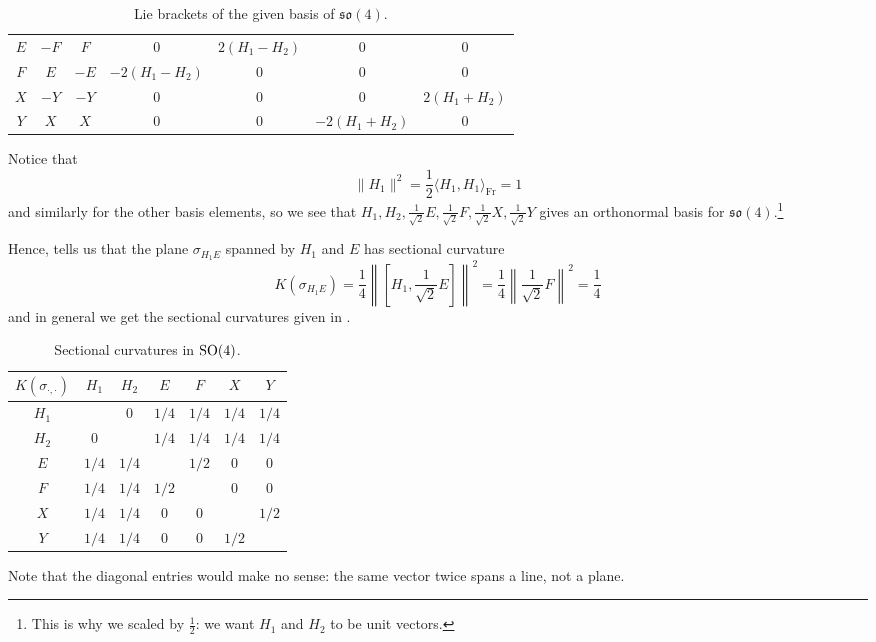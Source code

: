 \begin{example}
\begin{table}
\begin{center}
\begin{tabular}{c|cccccc}
			$E$ & $-F$ & $F$ & $0$ & $2(H_1-H_2)$ & $0$ & $0$ \\
			$F$ & $E$ & $-E$ & $-2(H_1-H_2)$ & $0$ & $ 0$ & $0$ \\
			$X$ & $-Y$ & $-Y$ & $0$ & $0$ & $0$ & $2(H_1+H_2)$ \\
			$Y$ & $X$ & $X$ & $0$ & $0$ & $-2(H_1+H_2)$ & $0$ 
		\end{tabular}
		\end{center}
		\caption{Lie brackets of the given basis of $\mathfrak{so}(4)$.}
		\label{tab:so4 mult table}
	\end{table}
	Notice that
	\[
		\|H_1\|^2 = \frac{1}{2} \langle H_1, H_1 \rangle_{\text{Fr}} = 1
	\]
	and similarly for the other basis elements, so we see that $H_1, H_2, \frac{1}{\sqrt{2}}E, \frac{1}{\sqrt{2}}F, \frac{1}{\sqrt{2}}X, \frac{1}{\sqrt{2}}Y$ gives an orthonormal basis for $\mathfrak{so}(4)$.\footnote{This is why we scaled by $\frac{1}{2}$: we want $H_1$ and $H_2$ to be unit vectors.} 
	
	Hence,  tells us that the plane $\sigma_{H_1E}$ spanned by $H_1$ and $E$ has sectional curvature
	\[
		K(\sigma_{H_1E}) = \frac{1}{4}\left\|\left[H_1,\frac{1}{\sqrt{2}}E\right]\right\|^2 = \frac{1}{4}\left\|\frac{1}{\sqrt{2}}F\right\|^2 = \frac{1}{4}
	\]
	and in general we get the sectional curvatures given in .
	\begin{table}
		\begin{center}
		\begin{tabular}{c|cccccc}
			$K(\sigma_{\cdot, \cdot})$ & $H_1$ & $H_2$ & $E$ & $F$ & $X$ & $Y$ \\
			\hline
			$H_1$ &  & $0$ & $1/4$ & $1/4$ & $1/4$ & $1/4$ \\
			$H_2$ & $0$ &  & $1/4$ & $1/4$ & $1/4$ & $1/4$ \\
			$E$ & $1/4$ & $1/4$ &  & $1/2$ & $0$ & $0$ \\
			$F$ & $1/4$ & $1/4$ & $1/2$ &  & $ 0$ & $0$ \\
			$X$ & $1/4$ & $1/4$ & $0$ & $0$ &  & $1/2$ \\
			$Y$ & $1/4$ & $1/4$ & $0$ & $0$ & $1/2$ & 
		\end{tabular}
		\end{center}
		\caption{Sectional curvatures in  $\operatorname{SO}(4)$.}
		\label{tab:so4 sectional curvatures}
	\end{table}
	Note that the diagonal entries would make no sense: the same vector twice spans a line, not a plane.
\end{example}